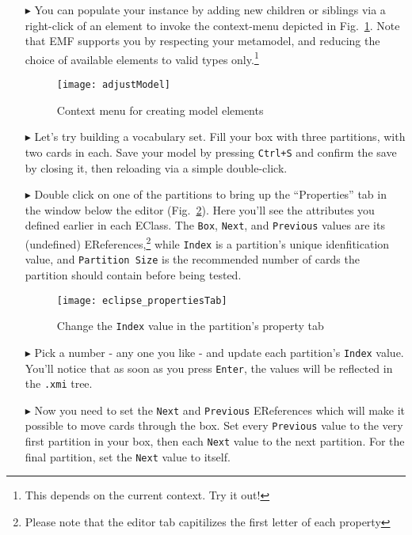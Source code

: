 \begin{itemize}
\clearpage

\item[$\blacktriangleright$] You can populate your instance by adding new children or siblings via a right-click of an element to invoke the
context-menu depicted in Fig.~\ref{fig:create_instance}. Note that EMF supports you by respecting your metamodel, and reducing the choice of available elements
to valid types only.\footnote{This depends on the current context. Try it out!}

\begin{figure}[htbp]
	\centering
  \texttt{[image: adjustModel]}
	\caption{Context menu for creating model elements}
	\label{fig:create_instance}
\end{figure}

\item[$\blacktriangleright$] Let's try building a vocabulary set. Fill your box with three partitions, with two cards in each. Save your model by pressing
\texttt{Ctrl+S} and confirm the save by closing it, then reloading via a simple double-click.

\item[$\blacktriangleright$] Double click on one of the partitions to bring up the ``Properties'' tab in the window below the editor
(Fig.~\ref{fig:properties_partition}). Here you'll see the attributes you defined earlier in each EClass. The \texttt{Box}, \texttt{Next}, and \texttt{Previous}
values are its (undefined) EReferences,\footnote{Please note that the editor tab capitilizes the first letter of each property} while \texttt{Index} is a
partition's unique idenfitication value, and \texttt{Partition Size} is the recommended number of cards the partition should contain before being tested.

\begin{figure}[h]
	\centering
  \texttt{[image: eclipse\_propertiesTab]}
	\caption{Change the \texttt{Index} value in the partition's property tab}
	\label{fig:properties_partition}
\end{figure}
\FloatBarrier

\vspace{0.5cm}

\item[$\blacktriangleright$] Pick a number - any one you like - and update each partition's \texttt{Index} value. You'll notice that as soon as you press
\texttt{Enter}, the values will be reflected in the \texttt{.xmi} tree.

\item[$\blacktriangleright$] Now you need to set the \texttt{Next} and \texttt{Previous} EReferences which will make it possible to move cards through the
box. Set every \texttt{Previous} value to the very first partition in your box, then each \texttt{Next} value to the next partition. For the final partition,
set the \texttt{Next} value to itself.


\end{itemize}
